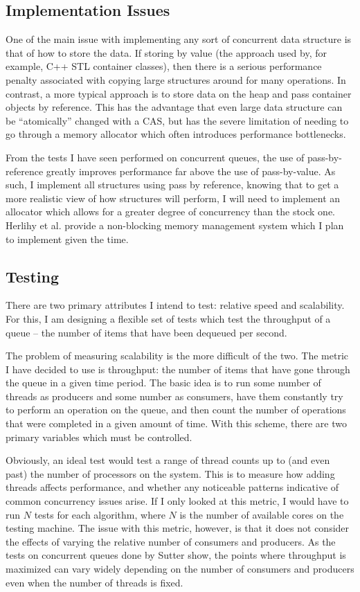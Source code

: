 \documentclass[12pt]{report}
\begin{document}
\subsection{Implementation Issues}
One of the main issue with implementing any sort of concurrent data structure
is that of how to store the data. If storing by value (the approach used by,
for example, C++ STL container classes), then there is a serious performance
penalty associated with copying large structures around for many operations. In
contrast, a more typical approach is to store data on the heap and pass
container objects by reference. This has the advantage that even large data
structure can be ``atomically'' changed with a CAS, but has the severe
limitation of needing to go through a memory allocator which often introduces
performance bottlenecks.

From the tests I have seen performed on concurrent queues, the use of
pass-by-reference greatly improves performance far above the use of
pass-by-value.\cite{suttertest}  As such, I implement all structures using pass
by reference, knowing that to get a more realistic view of how structures will
perform, I will need to implement an allocator which allows for a greater
degree of concurrency than the stock one. Herlihy et al. provide a non-blocking
memory management system which I plan to implement given the
time.\cite{herlihy2005}

\subsection{Testing}
There are two primary attributes I intend to test: relative speed and
scalability. For this, I am designing a flexible set of tests which test the
throughput of a queue -- the number of items that have been dequeued per
second.

The problem of measuring scalability is the more difficult of the two. The
metric I have decided to use is throughput: the number of items that have gone
through the queue in a given time period. The basic idea is to run some number
of threads as producers and some number as consumers, have them constantly try
to perform an operation on the queue, and then count the number of operations
that were completed in a given amount of time. With this scheme,
there are two primary variables which must be controlled.

Obviously, an ideal test would test a range of thread counts up to (and even
past) the number of processors on the system. This is to measure how adding
threads affects performance, and whether any noticeable patterns indicative of
common concurrency issues arise. If I only looked at this metric, I would have
to run $N$ tests for each algorithm, where $N$ is the number of available cores
on the testing machine. The issue with this metric, however, is that it does
not consider the effects of varying the relative number of consumers and
producers. As the tests on concurrent queues done by Sutter\cite{suttertest} show,
the points where throughput is maximized can vary widely depending on the
number of consumers and producers even when the number of threads is fixed.
\end{document}
